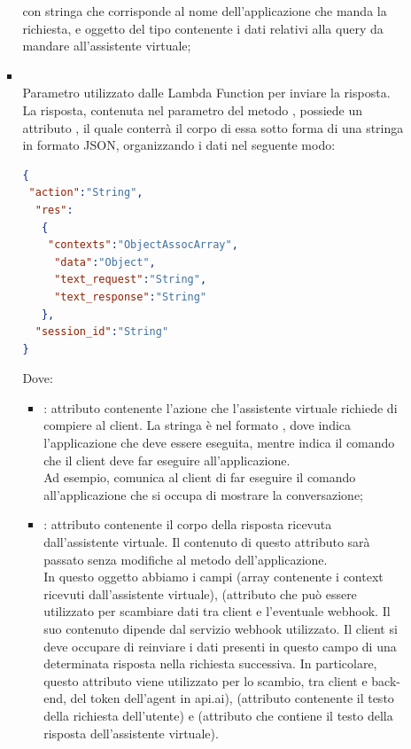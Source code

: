 \begin{itemize}
\begin{itemize}
\begin{itemize}
con  stringa che corrisponde al nome dell'applicazione che manda la richiesta, e  oggetto del tipo  contenente i dati relativi alla query da mandare all'assistente virtuale;
			\item {} \\
			Parametro utilizzato dalle Lambda Function per inviare la risposta. La risposta, contenuta nel  parametro del metodo , possiede un attributo , il quale conterrà il corpo di essa sotto forma di una stringa in formato JSON, organizzando i dati nel seguente modo:
 \begin{lstlisting}[language=json,firstnumber=1]
{
 "action":"String",
  "res":
   {
    "contexts":"ObjectAssocArray",
     "data":"Object",
     "text_request":"String",
     "text_response":"String"
   },
  "session_id":"String"
}
\end{lstlisting}
Dove:
\begin{itemize}
   \item {}: attributo contenente l'azione che l'assistente virtuale richiede di compiere al client. La stringa è nel formato , dove  indica l'applicazione che deve essere   eseguita, mentre  indica il comando che il client deve far eseguire all'applicazione. \\ Ad esempio,  comunica al client di far eseguire il comando  all'applicazione che si occupa di mostrare la conversazione;
   \item {}: attributo contenente il corpo della risposta ricevuta dall'assistente virtuale. Il contenuto di questo attributo sarà passato senza modifiche al metodo  dell'applicazione.\\ In questo oggetto abbiamo i campi  (array contenente i context ricevuti dall'assistente virtuale),  (attributo che può essere utilizzato per scambiare dati tra client e l'eventuale webhook. Il suo contenuto dipende dal servizio webhook utilizzato. Il client si deve occupare di reinviare i dati presenti in questo campo  di una determinata risposta nella richiesta successiva. In particolare, questo attributo viene utilizzato per lo scambio, tra client e back-end, del token dell'agent in api.ai),  (attributo contenente il testo della richiesta dell'utente) e (attributo che contiene il testo della risposta dell'assistente virtuale).

\end{itemize}
\end{itemize}
\end{itemize}
\end{itemize}
